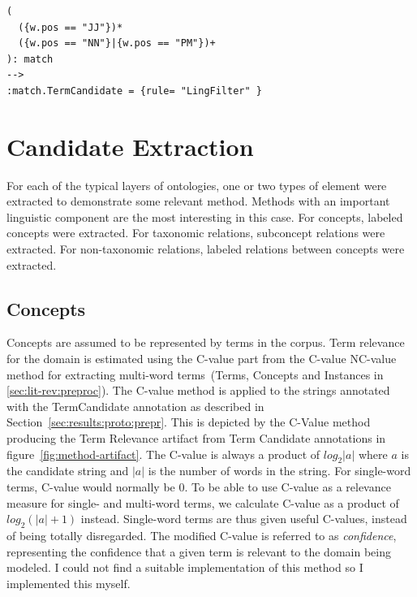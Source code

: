 \documentclass[a4paper]{report}
\begin{document}
\begin{Code}
\begin{lstlisting}[frame=single]
(
  ({w.pos == "JJ"})*
  ({w.pos == "NN"}|{w.pos == "PM"})+
): match
-->
:match.TermCandidate = {rule= "LingFilter" }
\end{lstlisting}
\end{Code}

\section{Candidate Extraction}
\label{sec:results:proto:cands}

For each of the typical layers of ontologies, one or two types of element were extracted to demonstrate some relevant method.
Methods with an important linguistic component are the most interesting in this case. 
For concepts, labeled concepts were extracted.
For taxonomic relations, subconcept relations were extracted.
For non-taxonomic relations, labeled relations between concepts were extracted.

\subsection{Concepts}

Concepts are assumed to be represented by terms in the corpus.
Term relevance for the domain is estimated using the C-value part from the C-value NC-value method for extracting multi-word terms~(Terms, Concepts and Instances in \ref{sec:lit-rev:preproc}).
The C-value method is applied to the strings annotated with the TermCandidate annotation as described in Section~\ref{sec:results:proto:prepr}.
This is depicted by the C-Value method producing the Term Relevance artifact from Term Candidate annotations in figure~\ref{fig:method-artifact}.
The C-value is always a product of \(log_{2} |a|\) where \(a\) is the candidate string and \(|a|\) is the number of words in the string.
For single-word terms, C-value would normally be \(0\).
To be able to use C-value as a relevance measure for single- and multi-word terms, we calculate C-value as a product of \(log_{2} (|a|+1)\) instead.
Single-word terms are thus given useful C-values, instead of being totally disregarded.
The modified C-value is referred to as \emph{confidence}, representing the confidence that a given term is relevant to the domain being modeled.
I could not find a suitable implementation of this method so I implemented this myself.
\end{document}
